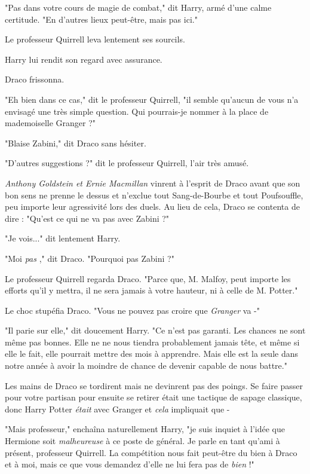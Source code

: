 "Pas dans votre cours de magie de combat," dit Harry, armé d'une calme certitude. "En d'autres lieux peut-être, mais pas ici."

Le professeur Quirrell leva lentement ses sourcils.

Harry lui rendit son regard avec assurance.

Draco frissonna.

"Eh bien dans ce cas," dit le professeur Quirrell, "il semble qu'aucun de vous n'a envisagé une très simple question. Qui pourrais-je nommer à la place de mademoiselle Granger ?"

"Blaise Zabini," dit Draco sans hésiter.

"D'autres suggestions ?" dit le professeur Quirrell, l'air très amusé.

\emph{Anthony Goldstein et Ernie Macmillan}  vinrent à l'esprit de Draco avant que son bon sens ne prenne le dessus et n'exclue tout Sang-de-Bourbe et tout Poufsouffle, peu importe leur agressivité lors des duels. Au lieu de cela, Draco se contenta de dire : "Qu'est ce qui ne va pas avec Zabini ?"

"Je vois..." dit lentement Harry.

"Moi \emph{pas} ," dit Draco. "Pourquoi pas Zabini ?"

Le professeur Quirrell regarda Draco. "Parce que, M. Malfoy, peut importe les efforts qu'il y mettra, il ne sera jamais à votre hauteur, ni à celle de M. Potter."

Le choc stupéfia Draco. "Vous ne pouvez pas croire que \emph{Granger}  va -"

"Il parie sur elle," dit doucement Harry. "Ce n'est pas garanti. Les chances ne sont même pas bonnes. Elle ne ne nous tiendra probablement jamais tête, et même si elle le fait, elle pourrait mettre des mois à apprendre. Mais elle est la seule dans notre année à avoir la moindre de chance de devenir capable de nous battre."

Les mains de Draco se tordirent mais ne devinrent pas des poings. Se faire passer pour votre partisan pour ensuite se retirer était une tactique de sapage classique, donc Harry Potter \emph{était } avec Granger et \emph{cela}  impliquait que -

"Mais professeur," enchaîna naturellement Harry, "je suis inquiet à l'idée que Hermione soit \emph{malheureuse}  à ce poste de général. Je parle en tant qu'ami à présent, professeur Quirrell. La compétition nous fait peut-être du bien à Draco et à moi, mais ce que vous demandez d'elle ne lui fera pas de \emph{bien}  !"

